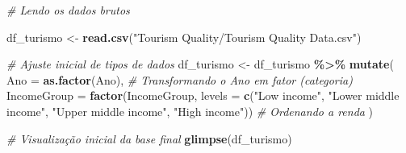 \documentclass[
]{article}
\newenvironment{Shaded}{\begin{snugshade}}{\end{snugshade}}
\newcommand{\AttributeTok}[1]{\textcolor[rgb]{0.13,0.29,0.53}{#1}}
\newcommand{\CommentTok}[1]{\textcolor[rgb]{0.56,0.35,0.01}{\textit{#1}}}
\newcommand{\FunctionTok}[1]{\textcolor[rgb]{0.13,0.29,0.53}{\textbf{#1}}}
\newcommand{\NormalTok}[1]{#1}
\newcommand{\OtherTok}[1]{\textcolor[rgb]{0.56,0.35,0.01}{#1}}
\newcommand{\SpecialCharTok}[1]{\textcolor[rgb]{0.81,0.36,0.00}{\textbf{#1}}}
\newcommand{\StringTok}[1]{\textcolor[rgb]{0.31,0.60,0.02}{#1}}
\begin{document}
\begin{Shaded}
\begin{Highlighting}[]
\CommentTok{\# Lendo os dados brutos}

\NormalTok{df\_turismo }\OtherTok{\textless{}{-}} \FunctionTok{read.csv}\NormalTok{(}\StringTok{"Tourism Quality/Tourism Quality Data.csv"}\NormalTok{)}

\CommentTok{\# Ajuste inicial de tipos de dados}
\NormalTok{df\_turismo }\OtherTok{\textless{}{-}}\NormalTok{ df\_turismo }\SpecialCharTok{\%\textgreater{}\%}
  \FunctionTok{mutate}\NormalTok{(}
    \AttributeTok{Ano =} \FunctionTok{as.factor}\NormalTok{(Ano), }\CommentTok{\# Transformando o Ano em fator (categoria)}
    \AttributeTok{IncomeGroup =} \FunctionTok{factor}\NormalTok{(IncomeGroup, }
                         \AttributeTok{levels =} \FunctionTok{c}\NormalTok{(}\StringTok{"Low income"}\NormalTok{, }\StringTok{"Lower middle income"}\NormalTok{, }
                                    \StringTok{"Upper middle income"}\NormalTok{, }\StringTok{"High income"}\NormalTok{)) }\CommentTok{\# Ordenando a renda}
\NormalTok{  )}

\CommentTok{\# Visualização inicial da base final}
\FunctionTok{glimpse}\NormalTok{(df\_turismo)}
\end{Highlighting}
\end{Shaded}
\end{document}
